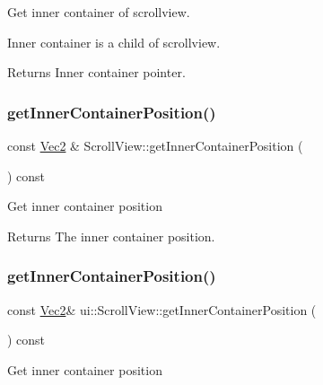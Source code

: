 Get inner container of scrollview.

Inner container is a child of scrollview.

\begin{DoxyReturn}{Returns}
Inner container pointer. 
\end{DoxyReturn}
\mbox{\label{classui_1_1ScrollView_ab8fdf3e895c799cf9d456c3fc62990a0}} 
\subsubsection{\texorpdfstring{get\+Inner\+Container\+Position()}{getInnerContainerPosition()}\hspace{0.1cm}{\footnotesize\ttfamily [1/2]}}
{\footnotesize\ttfamily const \hyperlink{classVec2}{Vec2} \& Scroll\+View\+::get\+Inner\+Container\+Position (\begin{DoxyParamCaption}{ }\end{DoxyParamCaption}) const}

Get inner container position

\begin{DoxyReturn}{Returns}
The inner container position. 
\end{DoxyReturn}
\mbox{\label{classui_1_1ScrollView_a0ebc0dfd0a1b7a12104b4f69547158c3}} 
\subsubsection{\texorpdfstring{get\+Inner\+Container\+Position()}{getInnerContainerPosition()}\hspace{0.1cm}{\footnotesize\ttfamily [2/2]}}
{\footnotesize\ttfamily const \hyperlink{classVec2}{Vec2}\& ui\+::\+Scroll\+View\+::get\+Inner\+Container\+Position (\begin{DoxyParamCaption}{ }\end{DoxyParamCaption}) const}

Get inner container position

